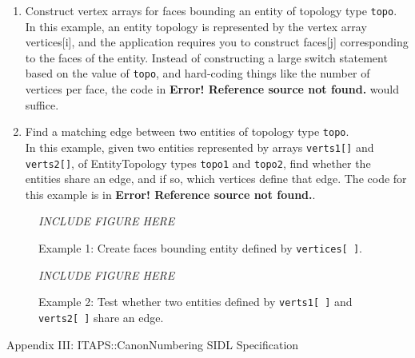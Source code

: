 \documentclass{article}
\begin{document}
\begin{enumerate}
\item Construct vertex arrays for faces bounding an entity of topology 
type {\tt topo}.\\

In this example, an entity topology is represented by the vertex 
array vertices[i], and the application requires you to construct 
faces[j] corresponding to the faces of the entity. Instead of 
constructing a large switch statement based on the value of {\tt topo}, 
and hard-coding things like the number of vertices per face, 
the code in \textbf{Error! Reference source not found.} would suffice.

\item  Find a matching edge between two entities of topology type {\tt topo}.\\

In this example, given two entities represented by arrays 
{\tt verts1[]} and {\tt verts2[]}, of EntityTopology types {\tt topo1}
and {\tt topo2}, 
find whether the entities share an edge, and if so, which vertices 
define that edge. The code for this example is in \textbf{Error! 
Reference source not found.}.
\end{enumerate}

\begin{figure}[htbp]
\begin{center}
\emph{INCLUDE FIGURE HERE}
\caption{Example 1: Create faces bounding entity defined by {\tt vertices[ ]}.}
\label{ex-fig1}
\end{center}
\end{figure}

\begin{figure}[htbp]
\begin{center}
\emph{INCLUDE FIGURE HERE}
\caption{Example 2: Test whether two entities defined by {\tt verts1[ ]} 
and {\tt verts2[ ]} share an edge.}
\label{ex-fig1}
\end{center}
\end{figure}


\newpage
\begin{Large}
{Appendix III:  ITAPS::CanonNumbering SIDL Specification\\}    %
\end{Large}
\vspace{.2in}
\end{document}
